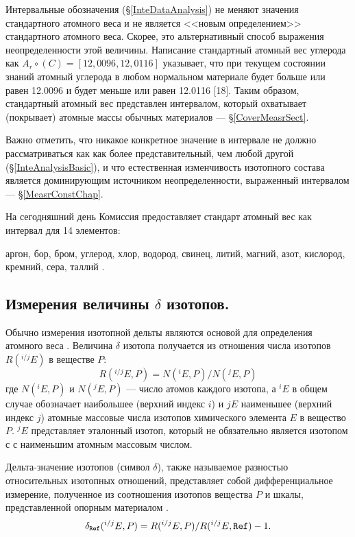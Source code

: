 \documentclass[a5paper,openany]{book}
\begin{document}
Интервальные обозначения (\S\ref{InteDataAnalysis})
не меняют значения стандартного атомного веса и не является <<новым определением>> стандартного атомного веса.
Скорее, это альтернативный способ выражения неопределенности этой величины. Написание
стандартный атомный вес углерода как $A_{r}{\circ}(C) = [12,0096, 12,0116]$ указывает, что при текущем состоянии знаний
атомный углерода в любом нормальном материале будет больше или равен 12.0096 и будет меньше или равен
12.0116 [18]. Таким образом, стандартный атомный вес представлен интервалом, который охватывает (покрывает) атомные
массы обычных материалов --- \S\ref{CoverMeasrSect}.

Важно отметить, что никакое конкретное значение в интервале не должно рассматриваться как
как более представительный, чем любой другой (\S\ref{InteAnalysisBasic}), и что естественная изменчивость изотопного состава является
доминирующим источником неопределенности, выраженный интервалом --- \S\ref{MeasrConstChap}.

На сегодняшний день Комиссия предоставляет стандарт
атомный вес как интервал для 14 элементов: \\
\begin{center}
аргон, бор, бром, углерод, хлор, водород, свинец, литий,
магний, азот, кислород, кремний, сера, таллий \cite{IPTEI}.
\end{center}


\subsection{Измерения величины $\delta$ изотопов.} \label{DeltaIsotopes}

Обычно измерения изотопной дельты являются основой для определения атомного веса  \cite{IUPACMS2020}.
Величина $\delta$ изотопа получается из отношения числа изотопов $R(^{i/j}E)$ в веществе $P$:
\begin{equation} \label{REP}
	R(^{i/j}E, P) = N(^iE, P)/N(^jE, P) %
\end{equation}
где $N(^iE, P)$ и $N(^jE, P)$ — число атомов каждого изотопа, а $^iE$ в общем случае обозначает наибольшее
(верхний индекс $i$) и $jE$ наименьшее (верхний индекс $j$) атомные массовые числа изотопов химического элемента $E$ в вещество $P$. $^jE$ представляет эталонный изотоп, который не обязательно является изотопом с с наименьшим атомным массовым числом. 

Дельта-значение изотопов (символ $\delta$), также называемое разностью относительных изотопных отношений, представляет собой дифференциальное измерение, полученное из соотношения изотопов вещества $P$ и шкалы, представленной опорным материалом \cite{IUPAC2014}.  
\begin{equation} \label{DeltaIsotopesDef} %
	\delta_{\tt Ref}(^{i/j}E, P)  = R(^{i/j}E, P)/R(^{i/j}E, {\tt Ref}) - 1.
\end{equation}
\end{document}
